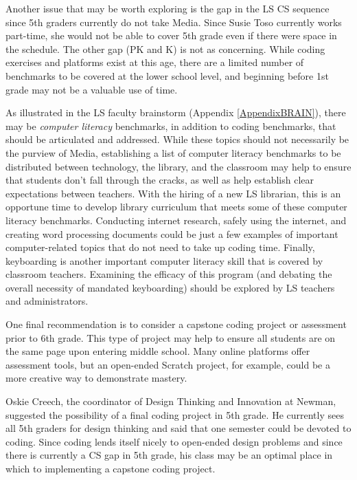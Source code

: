 Another issue that may be worth exploring is the gap in the LS CS sequence since 5th graders currently do not take Media. Since Susie Toso currently works part-time, she would not be able to cover 5th grade even if there were space in the schedule. The other gap (PK and K) is not as concerning. While coding exercises and platforms exist at this age, there are a limited number of benchmarks to be covered at the lower school level, and beginning before 1st grade may not be a valuable use of time.  \par
As illustrated in the LS faculty brainstorm (Appendix \ref{AppendixBRAIN}), there may be \textit{computer literacy} benchmarks, in addition to coding benchmarks, that should be articulated and addressed. While these topics should not necessarily be the purview of Media, establishing a list of computer literacy benchmarks to be distributed between technology, the library, and the classroom may help to ensure that students don't fall through the cracks, as well as help establish clear expectations between teachers. With the hiring of a new LS librarian, this is an opportune time to develop library curriculum that meets some of these computer literacy benchmarks. Conducting internet research, safely using the internet, and creating word processing documents could be just a few examples of important computer-related topics that do not need to take up coding time. Finally, keyboarding is another important computer literacy skill that is covered by classroom teachers. Examining the efficacy of this program (and debating the overall necessity of mandated keyboarding) should be explored by LS teachers and administrators. \par
One final recommendation is to consider a capstone coding project or assessment prior to 6th grade.  This type of project may help to ensure all students are on the same page upon entering middle school. Many online platforms offer assessment tools, but an open-ended Scratch project, for example, could be a more creative way to demonstrate mastery.\par
Oskie Creech, the coordinator of Design Thinking and Innovation at Newman, suggested the possibility of a final coding project in 5th grade. He currently sees all 5th graders for design thinking and said that one semester could be devoted to coding. Since coding lends itself nicely to open-ended design problems and since there is currently a CS gap in 5th grade, his class may be an optimal place in which to implementing a capstone coding project.\par 
